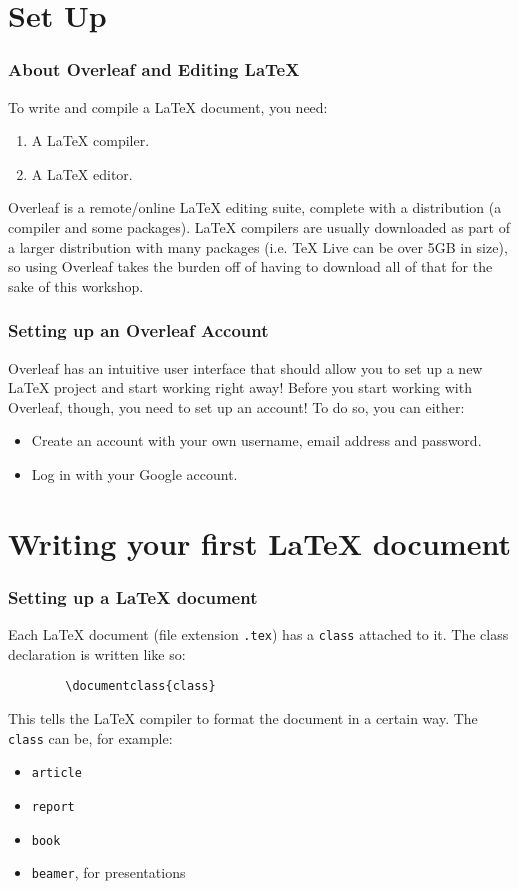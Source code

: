 \documentclass{beamer}
\newcommand{\biggap}{\newline{}\newline{}}
\begin{document}
	\section{Set Up}
	
	\begin{frame}
		\frametitle{About Overleaf and Editing \LaTeX{}}
		To write and compile a \LaTeX{} document, you need: \pause
		\begin{enumerate}
			\item A \LaTeX{} compiler.\pause
			\item A \LaTeX{} editor.
		\end{enumerate}
		\pause
		Overleaf is a remote/online \LaTeX{} editing suite, complete with a distribution (a compiler and some packages). \pause \LaTeX{} compilers are usually downloaded as part of a larger distribution with many packages (i.e. \TeX{} Live can be over 5GB in size), so using Overleaf takes the burden off of having to download all of that for the sake of this workshop.
	\end{frame}
	
	\begin{frame}
		\frametitle{Setting up an Overleaf Account}
		Overleaf has an intuitive user interface that should allow you to set up a new LaTeX project and start working right away!\pause\biggap
		Before you start working with Overleaf, though, you need to set up an account! \pause\biggap
		To do so, you can either:
		\begin{itemize}
			\item Create an account with your own username, email address and password.\pause
			\item Log in with your Google account.
		\end{itemize}
	\end{frame}
	
	\section{Writing your first \LaTeX{} document}
	
	\begin{frame}[fragile]
		\frametitle{Setting up a \LaTeX{} document}
		Each \LaTeX{} document (file extension \verb|.tex|) has a \verb|class| attached to it.
		The class declaration is written like so:
		\begin{lstlisting}
		\documentclass{class}
		\end{lstlisting}
		This tells the \LaTeX{} compiler to format the document in a certain way.\pause\biggap
		The \verb|class| can be, for example: \pause
		\begin{itemize}
			\item \verb|article| \pause
			\item \verb|report| \pause
			\item \verb|book| \pause
			\item \verb|beamer|, for presentations
		\end{itemize}
	\end{frame}
	
\end{document}
